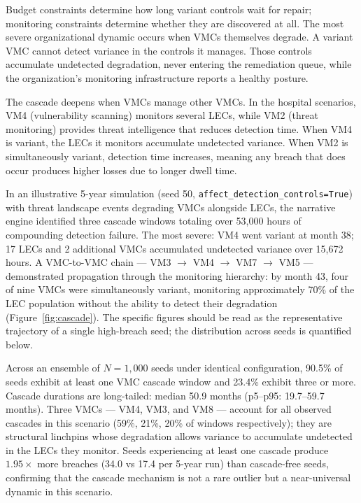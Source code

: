 \documentclass[11pt,a4paper]{article}
\begin{document}
Budget constraints determine how long variant controls wait for repair; monitoring constraints determine whether they are discovered at all. The most severe organizational dynamic occurs when VMCs themselves degrade. A variant VMC cannot detect variance in the controls it manages. Those controls accumulate undetected degradation, never entering the remediation queue, while the organization's monitoring infrastructure reports a healthy posture.

The cascade deepens when VMCs manage other VMCs. In the hospital scenarios, VM4 (vulnerability scanning) monitors several LECs, while VM2 (threat monitoring) provides threat intelligence that reduces detection time. When VM4 is variant, the LECs it monitors accumulate undetected variance. When VM2 is simultaneously variant, detection time increases, meaning any breach that does occur produces higher losses due to longer dwell time.

In an illustrative 5-year simulation (seed 50, \texttt{affect\_\allowbreak detection\_\allowbreak controls\allowbreak =True}) with threat landscape events degrading VMCs alongside LECs, the narrative engine identified three cascade windows totaling over 53,000 hours of compounding detection failure. The most severe: VM4 went variant at month 38; 17 LECs and 2 additional VMCs accumulated undetected variance over 15,672 hours. A VMC-to-VMC chain --- VM3 $\to$ VM4 $\to$ VM7 $\to$ VM5 --- demonstrated propagation through the monitoring hierarchy: by month 43, four of nine VMCs were simultaneously variant, monitoring approximately 70\% of the LEC population without the ability to detect their degradation (Figure~\ref{fig:cascade}). The specific figures should be read as the representative trajectory of a single high-breach seed; the distribution across seeds is quantified below.

Across an ensemble of $N=1{,}000$ seeds under identical configuration, 90.5\% of seeds exhibit at least one VMC cascade window and 23.4\% exhibit three or more. Cascade durations are long-tailed: median 50.9 months (p5--p95: 19.7--59.7 months). Three VMCs --- VM4, VM3, and VM8 --- account for all observed cascades in this scenario (59\%, 21\%, 20\% of windows respectively); they are structural linchpins whose degradation allows variance to accumulate undetected in the LECs they monitor. Seeds experiencing at least one cascade produce $1.95\times$ more breaches (34.0 vs 17.4 per 5-year run) than cascade-free seeds, confirming that the cascade mechanism is not a rare outlier but a near-universal dynamic in this scenario.
\end{document}
